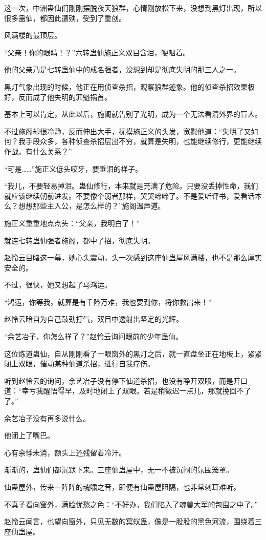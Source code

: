 \begin{this_body}
这一次，中洲蛊仙们刚刚摆脱夜天狼群，心情刚放松下来，没想到黑灯出现，所以很多蛊仙，都因此遭殃，受到了重创。

风满楼的最顶层。

“父亲！你的眼睛！？”六转蛊仙施正义双目含泪，哽咽着。

他的父亲乃是七转蛊仙中的成名强者，没想到却是彻底失明的那三人之一。

黑灯气象出现的时候，他正在用侦查杀招，观察狼群迹象。他的侦查杀招效果极好，反而成了他失明的罪魁祸首。

基本上可以肯定，从此以后，施阁就告别了光明，成为一个无法看清外界的盲人。

不过施阁却很冷静，反而伸出大手，抚摸施正义的头发，宽慰他道：“失明了又如何？我手段众多，各种侦查杀招层出不穷，就算是失明，也能继续修行，更能继续作战。有什么关系？”

“可是……”施正义低头咬牙，要垂泪的样子。

“我儿，不要轻易掉泪。蛊仙修行，本来就是充满了危险。只要没丢掉性命，我们就应该继续朝前进发。不要像个弱者那样，哭哭啼啼了。不是爱听评书，爱看话本么？想想那些主人公，是怎么样的？”施阁温声道。

施正义重重地点点头：“父亲，我明白了！”

就连七转蛊仙强者施阁，都中了招，彻底失明。

赵怜云目睹这一幕，她心头震动，头一次感到这座仙蛊屋风满楼，也不是那么厚实安全的。

不过，很快，她又想起了马鸿运。

“鸿运，你等我。就算是有千险万难，我也要到你，将你救出来！”

赵怜云暗自为自己鼓劲打气，双目中透射出坚定的光辉。

“余艺冶子，你怎么样了？”赵怜云询问眼前的少年蛊仙。

这位炼道蛊仙，自从刚刚看了一眼窗外的黑灯之后，就一直盘坐正在地板上，紧紧闭上双眼，催动某种仙道杀招，进行自我疗伤。

听到赵怜云的询问，余艺冶子没有停下仙道杀招，也没有睁开双眼，而是开口道：“幸亏我醒悟得早，及时地闭上了双眼。若是稍微迟一点儿，那就挽回不了了。”

余艺冶子没有再多说什么。

他闭上了嘴巴。

心有余悸未消，额头上还残留着冷汗。

渐渐的，蛊仙们都沉默下来。三座仙蛊屋中，无一不被沉闷的氛围笼罩。

仙蛊屋外，传来一阵阵的魂啸之音，即便有仙蛊屋阻隔，也非常刺耳难听。

不真子看向窗外，满脸忧愁之色：“不好办，我们陷入了魂兽大军的包围之中了。”

赵怜云闻言，也望向窗外，只见无数的冥蚁蛊，像是一股股的黑色河流，围绕着三座仙蛊屋。

\end{this_body}

